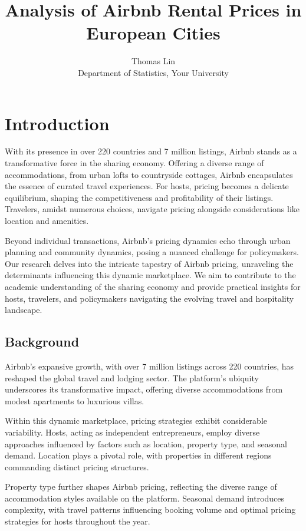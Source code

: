 \documentclass[12pt, letterpaper]{article}
\begin{document}
\title{Analysis of Airbnb Rental Prices in European Cities}
\author{Thomas Lin\\
Department of Statistics, Your University}
\maketitle

\section*{Introduction}
With its presence in over 220 countries and 7 million listings, Airbnb stands as a transformative force in the sharing economy. Offering a diverse range of accommodations, from urban lofts to countryside cottages, Airbnb encapsulates the essence of curated travel experiences. For hosts, pricing becomes a delicate equilibrium, shaping the competitiveness and profitability of their listings. Travelers, amidst numerous choices, navigate pricing alongside considerations like location and amenities.

Beyond individual transactions, Airbnb's pricing dynamics echo through urban planning and community dynamics, posing a nuanced challenge for policymakers. Our research delves into the intricate tapestry of Airbnb pricing, unraveling the determinants influencing this dynamic marketplace. We aim to contribute to the academic understanding of the sharing economy and provide practical insights for hosts, travelers, and policymakers navigating the evolving travel and hospitality landscape.

\subsection*{Background}
Airbnb's expansive growth, with over 7 million listings across 220 countries, has reshaped the global travel and lodging sector. The platform's ubiquity underscores its transformative impact, offering diverse accommodations from modest apartments to luxurious villas.

Within this dynamic marketplace, pricing strategies exhibit considerable variability. Hosts, acting as independent entrepreneurs, employ diverse approaches influenced by factors such as location, property type, and seasonal demand. Location plays a pivotal role, with properties in different regions commanding distinct pricing structures.

Property type further shapes Airbnb pricing, reflecting the diverse range of accommodation styles available on the platform. Seasonal demand introduces complexity, with travel patterns influencing booking volume and optimal pricing strategies for hosts throughout the year.
\end{document}
